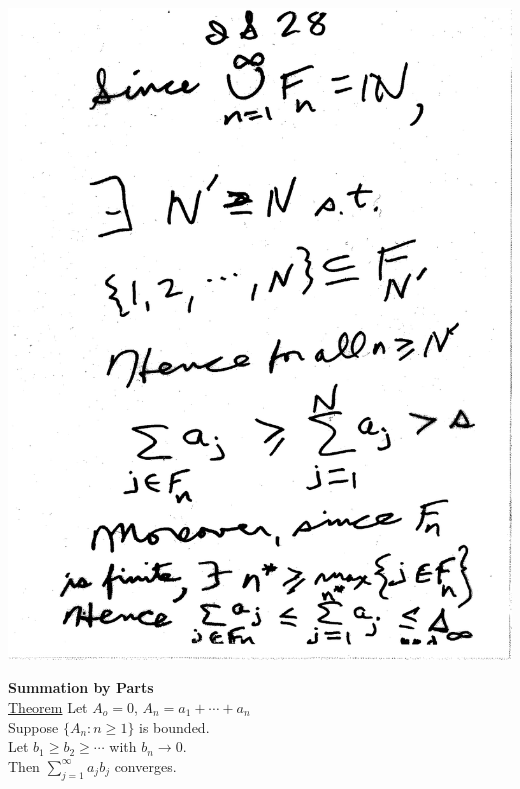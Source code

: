 \documentclass[10pt,a4paper]{article}
\begin{document}
{{\includegraphics[scale=.5]{Pages/IS_28}

\newpage

\textbf{Summation by Parts}
\vspace{2mm}
\\ \noindent \underline{Theorem} Let $A_o = 0$, $A_n = a_1 + \cdots + a_n$ 
\\ Suppose $\{ A_n: n\geq 1\}$ is bounded.
\\ Let $b_1 \geq b_2 \geq \cdots $ with $b_n \rightarrow 0.$
\\ \noindent Then $\sum_{j=1}^{\infty} a_j b_j$ converges.

}}
\end{document}
